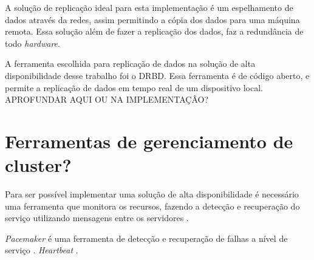 A solução de replicação ideal para esta implementação é um espelhamento de dados através da redes, assim permitindo a cópia dos dados para uma
máquina remota. Essa solução além de fazer a replicação dos dados, faz a redundância de todo \textit{hardware}.

A ferramenta escolhida para replicação de dados na solução de alta disponibilidade desse trabalho foi o \ac{DRBD}. Essa ferramenta é de código
aberto, e permite a replicação de dados em tempo real de um dispositivo local. 
APROFUNDAR AQUI OU NA IMPLEMENTAÇÂO?

\section{Ferramentas de gerenciamento de cluster?}
\label{section:toolcluster}

Para ser possível implementar uma solução de alta disponibilidade é necessário uma ferramenta que monitora os recursos, fazendo a detecção e
recuperação do serviço utilizando mensagens entre os servidores \cite{perkov2011}.

\textit{Pacemaker} é uma ferramenta de detecção e recuperação de falhas a nível de serviço \cite{perkov2011}. 
\textit{Heartbeat} \cite{zaminhani2008}.


